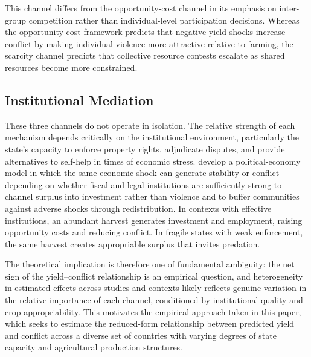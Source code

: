 This channel differs from the opportunity-cost channel in its emphasis on inter-group competition rather than individual-level participation decisions. Whereas the opportunity-cost framework predicts that negative yield shocks increase conflict by making individual violence more attractive relative to farming, the scarcity channel predicts that collective resource contests escalate as shared resources become more constrained.

\subsection{Institutional Mediation}

These three channels do not operate in isolation. The relative strength of each mechanism depends critically on the institutional environment, particularly the state's capacity to enforce property rights, adjudicate disputes, and provide alternatives to self-help in times of economic stress. \citet{BesleyPersson2009, BesleyPersson2011} develop a political-economy model in which the same economic shock can generate stability or conflict depending on whether fiscal and legal institutions are sufficiently strong to channel surplus into investment rather than violence and to buffer communities against adverse shocks through redistribution. In contexts with effective institutions, an abundant harvest generates investment and employment, raising opportunity costs and reducing conflict. In fragile states with weak enforcement, the same harvest creates appropriable surplus that invites predation.

The theoretical implication is therefore one of fundamental ambiguity: the net sign of the yield--conflict relationship is an empirical question, and heterogeneity in estimated effects across studies and contexts likely reflects genuine variation in the relative importance of each channel, conditioned by institutional quality and crop appropriability. This motivates the empirical approach taken in this paper, which seeks to estimate the reduced-form relationship between predicted yield and conflict across a diverse set of countries with varying degrees of state capacity and agricultural production structures.
